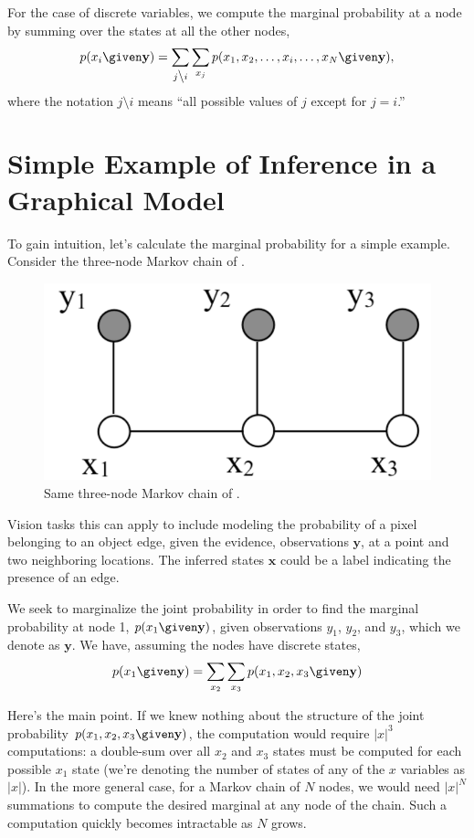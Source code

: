 For the case of discrete variables, we compute the marginal probability at a node by summing over the states at all the other nodes,
\begin{equation}
    p(x_i \given \mathbf{y}) =  \sum_{j  \mbox{\textbackslash} i} \sum_{x_j} 
    p(x_1, x_2, \ldots, x_i, \ldots, x_N \given \mathbf{y}),
    \label{eq:discreteMarginalization}
\end{equation}
where the notation $j \mbox{\textbackslash} i$ means ``all possible values of $j$ except for $j = i$.''

\section{Simple Example of Inference in a Graphical Model}
\label{sect:simpleexample}

To gain intuition, let's calculate the marginal probability for a
simple example.  Consider the three-node Markov chain 
of \fig{\ref{fig:chain2}}.
\begin{figure}
\centerline{\includegraphics[width=0.36\linewidth]{figures/graphical_models/x1x2x3y1y2y3.pdf}} 
\caption{Same three-node Markov chain of \fig{\ref{fig:chain}}.}
\label{fig:chain2}
\end{figure}

Vision tasks this can apply to include modeling the probability of a pixel
belonging to an object edge, given the evidence, observations $\mathbf{y}$, at a point and two
neighboring locations.  The inferred states $\mathbf{x}$ could be a label
indicating the presence of an edge.

We seek to marginalize the joint probability in order to
find the marginal probability at node 1, $p(x_1 \given \mathbf{y})$, given
observations $y_1$, $y_2$, and $y_3$, which we denote as $\mathbf{y}$.
We have, assuming the nodes have discrete states,
\begin{equation}
p(x_1 \given \mathbf{y}) = \sum_{x_2} \sum_{x_3}  p(x_1, x_2, x_3 \given \mathbf{y})
\label{eq:3chain}
\end{equation}

Here's the main point.  If we knew nothing about the structure of
the joint probability $p(x_1, x_2, x_3 \given \mathbf{y})$, the computation would require
$\left| x \right|^3$ computations: a double-sum over all $x_2$ and $x_3$ states must
be computed
for each possible $x_1$ state (we're denoting the number of states of any of the $x$
variables as $\left| x \right|$).  In the more general case, for a Markov chain of
$N$ nodes, we would need $\left| x \right|^N$ summations to compute the desired
marginal at any node of the chain.  Such a computation quickly
becomes intractable as $N$ grows.

